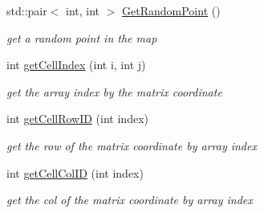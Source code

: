 \begin{DoxyCompactItemize}
std\+::pair$<$ int, int $>$ \hyperlink{classrrt__planner_1_1rrtPlannerROS_a06d1cb389e3ca07fb3b39173ce00c0a4}{Get\+Random\+Point} ()
\begin{DoxyCompactList}\small\item\em get a random point in the map \end{DoxyCompactList}\item 
int \hyperlink{classrrt__planner_1_1rrtPlannerROS_a047cc66d7055d8c39007c4de2db9ae59}{get\+Cell\+Index} (int i, int j)
\begin{DoxyCompactList}\small\item\em get the array index by the matrix coordinate \end{DoxyCompactList}\item 
int \hyperlink{classrrt__planner_1_1rrtPlannerROS_a77d03d9b7e48bd06504e318086b81339}{get\+Cell\+Row\+ID} (int index)
\begin{DoxyCompactList}\small\item\em get the row of the matrix coordinate by array index \end{DoxyCompactList}\item 
int \hyperlink{classrrt__planner_1_1rrtPlannerROS_ac2dfb825556d93e08c52c53142f0a081}{get\+Cell\+Col\+ID} (int index)
\begin{DoxyCompactList}\small\item\em get the col of the matrix coordinate by array index \end{DoxyCompactList}\end{DoxyCompactItemize}
